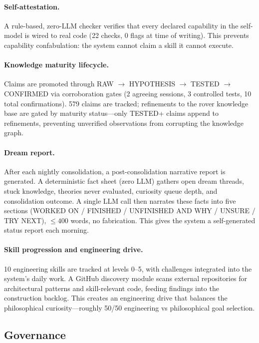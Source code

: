\documentclass[11pt,a4paper]{article}
\begin{document}
\paragraph{Self-attestation.} A rule-based, zero-LLM checker verifies that every declared capability in the self-model is wired to real code (22 checks, 0 flags at time of writing). This prevents capability confabulation: the system cannot claim a skill it cannot execute.

\paragraph{Knowledge maturity lifecycle.} Claims are promoted through RAW $\to$ HYPOTHESIS $\to$ TESTED $\to$ CONFIRMED via corroboration gates (2 agreeing sessions, 3 controlled tests, 10 total confirmations). 579 claims are tracked; refinements to the rover knowledge base are gated by maturity status---only TESTED+ claims append to refinements, preventing unverified observations from corrupting the knowledge graph.

\paragraph{Dream report.} After each nightly consolidation, a post-consolidation narrative report is generated. A deterministic fact sheet (zero LLM) gathers open dream threads, stuck knowledge, theories never evaluated, curiosity queue depth, and consolidation outcome. A single LLM call then narrates these facts into five sections (WORKED ON / FINISHED / UNFINISHED AND WHY / UNSURE / TRY NEXT), $\leq 400$ words, no fabrication. This gives the system a self-generated status report each morning.

\paragraph{Skill progression and engineering drive.} 10 engineering skills are tracked at levels 0--5, with challenges integrated into the system's daily work. A GitHub discovery module scans external repositories for architectural patterns and skill-relevant code, feeding findings into the construction backlog. This creates an engineering drive that balances the philosophical curiosity---roughly 50/50 engineering vs philosophical goal selection.

\subsection{Governance}
\label{sec:governance}
\end{document}
